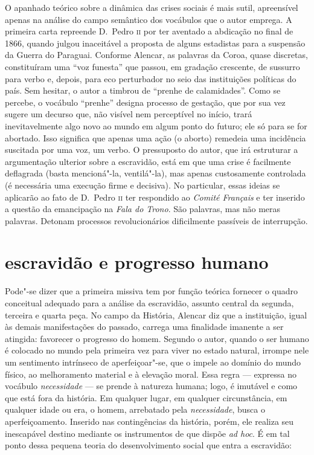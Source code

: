 O apanhado teórico sobre a dinâmica das crises sociais é mais sutil,
apreensível apenas na análise do campo semântico dos vocábulos que o
autor emprega. A primeira carta repreende D.~Pedro \textsc{ii} por ter aventado
a abdicação no final de 1866, quando julgou inaceitável a proposta de
alguns estadistas para a suspensão da Guerra do Paraguai. Conforme
Alencar, as palavras da Coroa, quase discretas, constituíram uma ``voz
funesta'' que passou, em gradação crescente, de sussurro para verbo e,
depois, para eco perturbador no seio das instituições políticas do
país. Sem hesitar, o autor a timbrou de ``prenhe de calamidades''. Como
se percebe, o vocábulo ``prenhe'' designa processo de gestação, que por
sua vez sugere um decurso que, não visível nem perceptível no início,
trará inevitavelmente algo novo ao mundo em algum ponto do futuro; ele
só para se for abortado. Isso significa que apenas uma ação (o aborto)
remedeia uma incidência suscitada por uma voz, um verbo. O pressuposto
do autor, que irá estruturar a argumentação ulterior sobre a
escravidão, está em que uma crise é facilmente deflagrada (basta
mencioná"-la, ventilá"-la), mas apenas custosamente controlada (é
necessária uma execução firme e decisiva). No particular, essas ideias
se aplicarão ao fato de D.~Pedro \textsc{ii} ter respondido ao \textit{Comité
Français} e ter inserido a questão da emancipação na \textit{Fala do
Trono}. São palavras, mas não meras palavras. Detonam processos
revolucionários dificilmente passíveis de interrupção.  

\section{escravidão e progresso humano} 

Pode"-se dizer que a primeira missiva tem por função teórica fornecer o
quadro conceitual adequado para a análise da escravidão, assunto
central da segunda, terceira e quarta peça. No campo da História,
Alencar diz que a instituição, igual às demais manifestações do
passado, carrega uma finalidade imanente a ser atingida: favorecer o
progresso do homem. Segundo o autor, quando o ser humano é colocado no
mundo pela primeira vez para viver no estado natural, irrompe nele um
sentimento intrínseco de aperfeiçoar"-se, que o impele ao domínio do
mundo físico, ao melhoramento material e à  elevação moral. Essa regra ---
expressa no vocábulo \textit{necessidade} --- se prende à  natureza
humana; logo, é imutável e como que está fora da história. Em qualquer
lugar, em qualquer circunstância, em qualquer idade ou era, o homem,
arrebatado pela \textit{necessidade}, busca o aperfeiçoamento. Inserido
nas contingências da história, porém, ele realiza seu inescapável
destino mediante os instrumentos de que dispõe \textit{ad hoc}. É em
tal ponto dessa pequena teoria do desenvolvimento social que entra a escravidão: 

